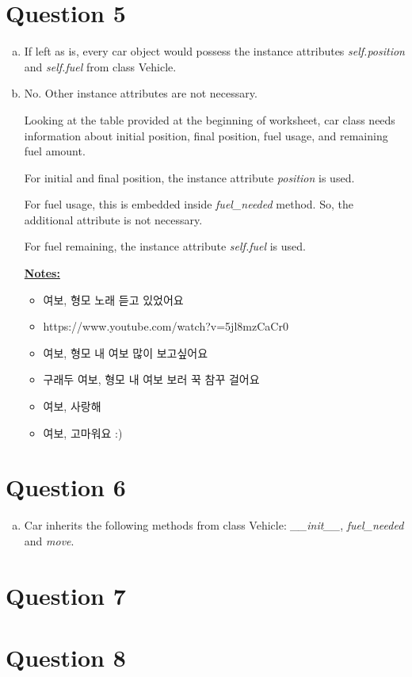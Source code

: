 \documentclass[12pt]{article}
\begin{document}
\section*{Question 5}
\begin{enumerate}[a.]
    \item If left as is, every car object would possess the instance attributes
    \textit{self.position} and \textit{self.fuel} from class Vehicle.

    \item No. Other instance attributes are not necessary.

    \bigskip

    Looking at the table provided at the beginning of worksheet, car class needs
    information about initial position, final position, fuel usage, and remaining fuel amount.

    \bigskip

    For initial and final position, the instance attribute \textit{position} is used.

    \bigskip

    For fuel usage, this is embedded inside \textit{fuel\_needed} method. So,
    the additional attribute is not necessary.

    \bigskip

    For fuel remaining, the instance attribute \textit{self.fuel} is used.

    \bigskip

    \underline{\textbf{Notes:}}

    \begin{itemize}
        \item 여보, 형모 노래 듣고 있었어요
        \item https://www.youtube.com/watch?v=5jl8mzCaCr0
        \item 여보, 형모 내 여보 많이 보고싶어요
        \item 구래두 여보, 형모 내 여보 보러 꾹 참꾸 걸어요
        \item 여보, 사랑해
        \item 여보, 고마워요 :)
    \end{itemize}

\end{enumerate}

\section*{Question 6}
\begin{enumerate}[a.]
    \item Car inherits the following methods from class Vehicle: \textit{\_\_init\_\_},
    \textit{fuel\_needed} and \textit{move}.
\end{enumerate}


\section*{Question 7}

\section*{Question 8}
\end{document}
